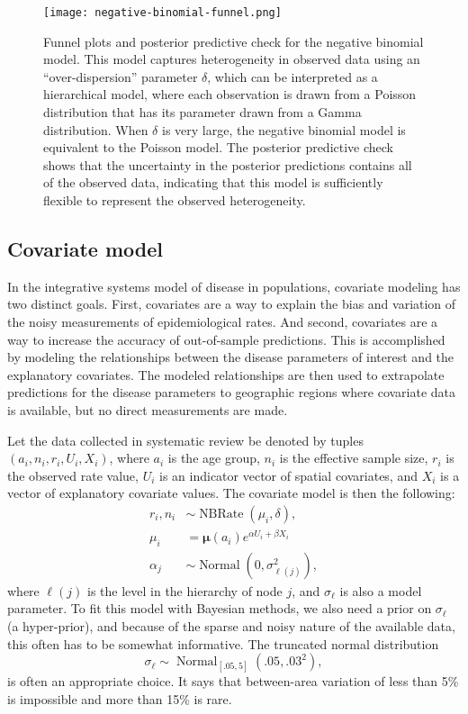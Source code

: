 \documentclass[12pt]{article}
\newcommand{\1}{\mathbf{1}}
\newcommand{\0}{\mathbf{0}}
\newcommand{\Normal}{\operatorname{Normal}}
\newcommand{\NBRate}{\operatorname{NBRate}}
\def\boldmu{\boldsymbol{\mu}}
\begin{document}
\begin{figure}[ht]
\begin{center}
\texttt{[image: negative-binomial-funnel.png]}

\end{center}
\caption{Funnel plots and posterior predictive check for the negative
  binomial model. This model captures heterogeneity in observed data
  using an ``over-dispersion'' parameter $\delta$, which can be
  interpreted as a hierarchical model, where each observation is drawn
  from a Poisson distribution that has its parameter drawn from a
  Gamma distribution.  When $\delta$ is very large, the negative
  binomial model is equivalent to the Poisson model.  The posterior
  predictive check shows that the uncertainty in the posterior
  predictions contains all of the observed data, indicating that this
  model is sufficiently flexible to represent the observed
  heterogeneity.} \label{rate-model-negative-binomial-funnel}
\end{figure}


\subsection{Covariate model}
In the integrative systems model of disease in populations, covariate
modeling has two distinct goals.  First, covariates are a way to
explain the bias and variation of the noisy measurements of
epidemiological rates.  And second, covariates are a way to increase
the accuracy of out-of-sample predictions.  This is accomplished by
modeling the relationships between the disease parameters of interest
and the explanatory covariates. The modeled relationships are then
used to extrapolate predictions for the disease parameters to
geographic regions where covariate data is available, but no direct
measurements are made.

Let the data collected in systematic review be denoted by tuples
$\left(a_i, n_i, r_i, U_i, X_i\right)$, where $a_i$ is the age group,
$n_i$ is the effective sample size, $r_i$ is the observed rate value,
$U_i$ is an indicator vector of spatial covariates, and $X_i$ is a
vector of explanatory covariate values. The covariate model is then
the following:
\begin{align*}
r_i, n_i &\sim \NBRate\left(\mu_i, \delta\right),\\
\mu_i &= \boldmu(a_i)e^{\alpha U_i+\beta X_i}\\
\alpha_j &\sim \Normal\left(0, \sigma_{\ell(j)}^2\right),
\end{align*}
where $\ell(j)$ is the level in the hierarchy of node $j$, and
$\sigma_\ell$ is also a model parameter. To fit this model with
Bayesian methods, we also need a prior on $\sigma_\ell$ (a
hyper-prior), and because of the sparse and noisy nature of the
available data, this often has to be somewhat informative.  The
truncated normal distribution
\[
\sigma_\ell \sim \Normal_{[.05,5]}\left(.05, .03^2\right),
\]
is often an appropriate choice. It says that between-area variation of
less than 5\% is impossible and more than 15\% is rare.
\end{document}
